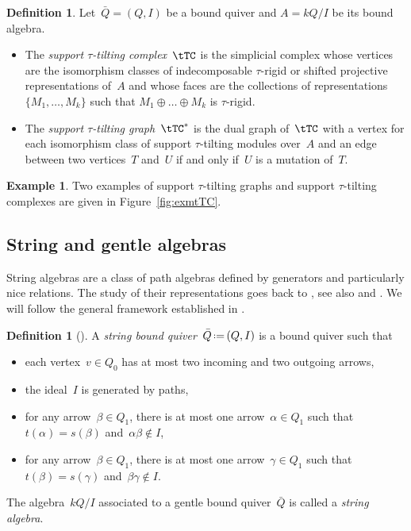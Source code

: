 \documentclass{amsart}
\theoremstyle{definition}
\newtheorem{definition}[theorem]{Definition}
\newtheorem{example}[theorem]{Example}
\newcommand{\eqdef}{\mbox{\,\raisebox{0.2ex}{\scriptsize\ensuremath{\mathrm:}}\ensuremath{=}\,}} %
\newcommand{\darkblue}{\color{darkblue}} %
\newcommand{\defn}[1]{\textsl{\darkblue #1}} %
\begin{document}
\begin{definition}\label{def: stautilt complex}
Let~$\bar Q = (Q,I)$ be a bound quiver and $A = kQ/I$ be its bound algebra.
\begin{itemize}
\item The \defn{support $\tau$-tilting complex}~$\tTC$ is the simplicial complex whose vertices are the isomorphism classes of indecomposable $\tau$-rigid or shifted projective representations of~$A$ and whose faces are the collections of representations~$\{M_1, \dots, M_k\}$ such that $M_1 \oplus \dots \oplus M_k$ is $\tau$-rigid.
\item The \defn{support $\tau$-tilting graph}~$\tTC^*$ is the dual graph of~$\tTC$ with a vertex for each isomorphism class of support $\tau$-tilting modules over~$A$ and an edge between two vertices~$T$ and~$U$ if and only if~$U$ is a mutation of~$T$.
\end{itemize}
\end{definition}

\begin{example}
 Two examples of support $\tau$-tilting graphs and support $\tau$-tilting complexes are given in Figure~\ref{fig:exmtTC}.
\end{example}

\subsection{String and gentle algebras}
\label{subsec:stringGentleAlgebra}

String algebras are a class of path algebras defined by generators and particularly nice relations.
The study of their representations goes back to \cite{GelfandPonomarev}, see also \cite{DonovanFreislich} and \cite{WaldWaschbusch}.
We will follow the general framework established in \cite{ButlerRingel}.

\begin{definition}[\cite{ButlerRingel}]
A \defn{string bound quiver}~$\bar Q \eqdef (Q,I)$ is a bound quiver such that
\begin{itemize}
\item each vertex~$v \in Q_0$ has at most two incoming and two outgoing arrows,
\item the ideal~$I$ is generated by paths,
\item for any arrow~$\beta \in Q_1$, there is at most one arrow~$\alpha \in Q_1$ such that~$t(\alpha) = s(\beta)$ and~$\alpha\beta\notin I$,
\item for any arrow~$\beta \in Q_1$, there is at most one arrow~$\gamma \in Q_1$ such that~$t(\beta) = s(\gamma)$ and~$\beta\gamma\notin I$.
\end{itemize}
The algebra~$kQ/I$ associated to a gentle bound quiver~$\bar Q$ is called a \defn{string algebra}.
\end{definition}
\end{document}
